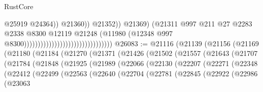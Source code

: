 \begin{lexlean}{RustCore}
\begin{coremodule}
                                                                            @25919
                                                                            @24364))
                                                                        @21360))
                                                                    @21352))
                                                                @21369)
                                                              (@21311
                                                                @997
                                                                @211
                                                                @27
                                                                @2283
                                                                @2338
                                                                @8300
                                                                @12119
                                                                @21248
                                                                (@11980
                                                                  (@12348
                                                                    @997
                                                                    @8300))))))))))))))))))))))))))))))))
@26083 := @21116
    (@21139
      (@21156
        (@21169
          (@21180
            (@21184
              (@21270
                (@21371
                  (@21426
                    (@21502
                      (@21557
                        (@21643
                          (@21707
                            (@21784
                              (@21848
                                (@21925
                                  (@21989
                                    (@22066
                                      (@22130
                                        (@22207
                                          (@22271
                                            (@22348
                                              (@22412
                                                (@22499
                                                  (@22563
                                                    (@22640
                                                      (@22704
                                                        (@22781
                                                          (@22845
                                                            (@22922
                                                              (@22986
                                                                (@23063

\end{coremodule}
\end{lexlean}
